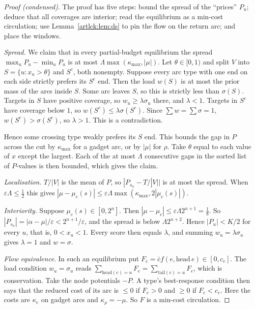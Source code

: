 \begin{proof}[Proof (condensed)]
The proof has five steps: bound the spread of the ``prices'' $P_u$; deduce that all coverages are
interior; read the equilibrium as a min-cost circulation; use Lemma~\ref{artlck:lem:ds} to pin the flow
on the return arc; and place the windows.

\emph{Spread.} We claim that in every partial-budget equilibrium the spread $\max_uP_u-\min_uP_u$ is at
most $\Lambda\max(\kappa_{\max},|\mu|)$. Let $\theta\in[0,1)$ and split $V$ into $S=\{u:x_u>\theta\}$ and
$S^c$, both nonempty. Suppose every arc type with one end on each side strictly prefers its $S^c$ end.
Then the load $w(S)$ is at most the prior mass of the arcs inside $S$. Some arc leaves $S$, so this is
strictly less than $\sigma(S)$. Targets in $S$ have positive coverage, so $w_u\ge\lambda\sigma_u$ there,
and $\lambda<1$. Targets in $S^c$ have coverage below $1$, so $w(S^c)\le\lambda\sigma(S^c)$. Since
$\sum w=\sum\sigma=1$, $w(S^c)>\sigma(S^c)$, so $\lambda>1$. This is a contradiction.

Hence some crossing
type weakly prefers its $S$ end. This bounds the gap in $P$ across the cut by $\kappa_{\max}$ for a gadget
arc, or by $|\mu|$ for $\rho$. Take $\theta$ equal to each value of $x$ except the largest. Each of the
at most $\Lambda$ consecutive gaps in the sorted list of $P$-values is then bounded, which gives the
claim.

\emph{Localisation.} $T/|V|$ is the mean of $P$, so $|P_{s_n}-T/|V||$ is at most the spread. When
$\varepsilon\Lambda\le\frac12$ this gives $|\mu-\mu_c(s)|\le\varepsilon\Lambda\max(\kappa_{\max},2|\mu_c(s)|)$.

\emph{Interiority.} Suppose $\mu_c(s)\in[0,2^n]$. Then $|\mu-\mu_c|\le\varepsilon\Lambda2^{n+1}=\frac18$.
So $|P_{s_n}|=|\alpha-\mu|/\varepsilon<2^{n+1}/\varepsilon$, and the spread is below $\Lambda2^{n+2}$.
Hence $|P_u|<K/2$ for every $u$, that is, $0<x_u<1$. Every score then equals $\lambda$, and summing
$w_u=\lambda\sigma_u$ gives $\lambda=1$ and $w=\sigma$.

\emph{Flow equivalence.} In such an equilibrium put $F_e=\bar c f(e,\mathrm{head}\,e)\in[0,c_e]$. The
load condition $w_u=\sigma_u$ reads $\sum_{\mathrm{head}(e)=u}F_e=\sum_{\mathrm{tail}(e)=u}F_e$, which is
conservation. Take the node potentials $-P$. A type's best-response condition then says that the reduced
cost of its arc is $\le0$ if $F_e>0$ and $\ge0$ if $F_e<c_e$. Here the costs are $\kappa_e$ on gadget arcs
and $\kappa_\rho=-\mu$. So $F$ is a min-cost circulation.


\end{proof}
